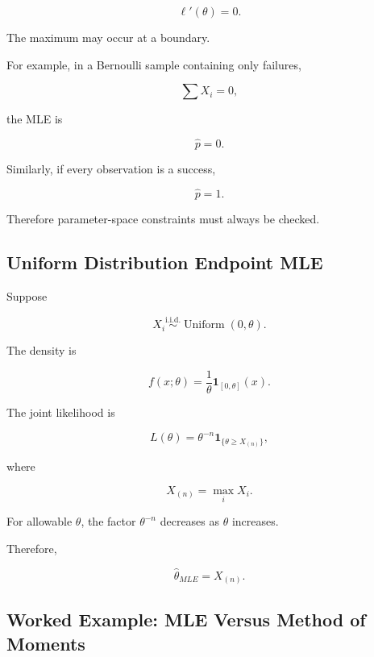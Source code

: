 \[
\ell'(\theta)=0.
\]

The maximum may occur at a boundary.

For example, in a Bernoulli sample containing only failures,

\[
\sum X_i=0,
\]

the MLE is

\[
\boxed{
\widehat{p}=0.
}
\]

Similarly, if every observation is a success,

\[
\boxed{
\widehat{p}=1.
}
\]

Therefore parameter-space constraints must always be checked.

\subsection{Uniform Distribution Endpoint MLE}
\label{subsec:uniform-endpoint-mle}

Suppose

\[
X_i
\overset{\text{i.i.d.}}{\sim}
\operatorname{Uniform}(0,\theta).
\]

The density is

\[
f(x;\theta)
=
\frac1\theta
\mathbf{1}_{[0,\theta]}(x).
\]

The joint likelihood is

\[
L(\theta)
=
\theta^{-n}
\mathbf{1}_{\{
\theta\geq X_{(n)}
\}},
\]

where

\[
X_{(n)}
=
\max_iX_i.
\]

For allowable \(\theta\), the factor \(\theta^{-n}\) decreases as
\(\theta\) increases.

Therefore,

\[
\boxed{
\widehat{\theta}_{MLE}
=
X_{(n)}.
}
\]

\subsection{Worked Example: MLE Versus Method of Moments}
\label{subsec:worked-mle-versus-mom}

